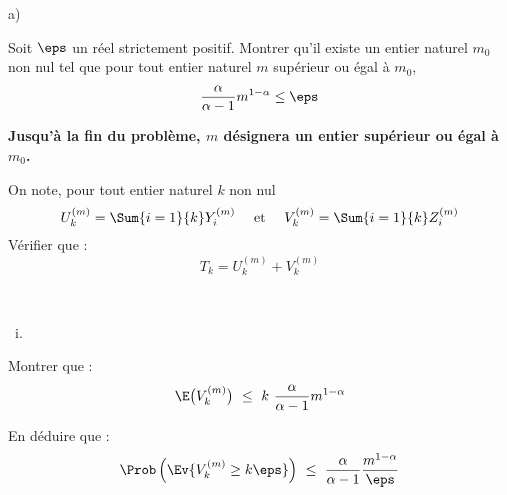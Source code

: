 \documentclass[11pt]{article}%
\begin{document}
\begin{liste}{a)}
  \setcounter{enumi}{3}
\item Soit $\eps$ un réel strictement positif. Montrer qu'il existe
  un entier naturel $m_{0}$ non nul tel que pour tout entier naturel
  $m$ supérieur ou égal à $m_{0}$,
  \[
  \dfrac{\alpha}{\alpha-1} m^{1-\alpha} \leq \eps
  \]
  
  
  
  
  
  
  \noindent
  \textbf{Jusqu'à la fin du problème, $m$ désignera un entier
    supérieur ou égal à $m_{0}$.}
  
\item On note, pour tout entier naturel $k$ non nul
  \[
  U_{k}^{(m)} = \Sum{i = 1}{k} Y_{i}^{(m)} \quad \text{ et } \quad
  V_{k}^{(m)} = \Sum{i = 1}{k} Z_{i}^{(m)}
  \]
  Vérifier que :
  \[
  T_{k} = U_{k}^{(m)} + V_{k}^{(m)}
  \]
  
  
  
  
\item ~\\[-1.15cm]
\end{liste}
\begin{liste}{\ i.}
\item Montrer que :
  \[
  \E\big(V_{k}^{(m)} \big) \ \leq \ k \ \dfrac{\alpha}{\alpha-1}
  m^{1-\alpha}
  \]
  
  
  
\item En déduire que :
  \[
  \Prob\left(\Ev{V_{k}^{(m)} \geq k \eps} \right) \ \leq \ 
  \dfrac{\alpha}{\alpha-1} \dfrac{m^{1-\alpha}}{\eps}
  \]

  
\end{liste}
\end{document}
